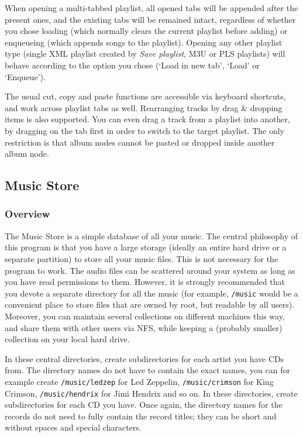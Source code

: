 \documentclass[10pt,english]{article}
\begin{document}
When opening a multi-tabbed playlist, all opened tabs will
be appended after the present ones, and the existing tabs will
be remained intact, regardless of whether you chose loading
(which normally clears the current playlist before adding) or
enqueueing (which appends songs to the playlist). Opening any
other playlist type (single XML playlist created by \textsl{Save
playlist}, M3U or PLS playlists) will behave according to
the option you chose (`Load in new tab', `Load' or
`Enqueue').




The usual cut, copy and paste functions are accessible via
keyboard shortcuts, and work across playlist tabs as
well. Rearranging tracks by drag \& dropping items is also
supported. You can even drag a track from a playlist into
another, by dragging on the tab first in order to switch to
the target playlist. The only restriction is that album nodes
cannot be pasted or dropped inside another album node.





\subsection{Music Store\label{idp191088}}

\subsubsection{Overview\label{idp192160}}



\noindent The Music Store is a simple database of all your
music. The central philosophy of this program is that you
have a large storage (ideally an entire hard drive or a
separate partition) to store all your music files. This is
not necessary for the program to work. The audio files can
be scattered around your system as long as you have read
permissions to them. However, it is strongly recommended
that you devote a separate directory for all the music (for
example, \texttt{/music} would be a convenient place to
store files that are owned by root, but readable by all
users). Moreover, you can maintain several collections on
different machines this way, and share them with other users
via NFS, while keeping a (probably smaller) collection on
your local hard drive.




In these central directories, create subdirectories for
each artist you have CDs from. The directory names do not
have to contain the exact names, you can for example create
\texttt{/music/ledzep} for Led Zeppelin,
\texttt{/music/crimson} for King Crimson,
\texttt{/music/hendrix} for Jimi Hendrix and so on. In
these directories, create subdirectories for each CD you
have. Once again, the directory names for the records do not
need to fully contain the record titles; they can be short
and without spaces and special characters.
\end{document}

